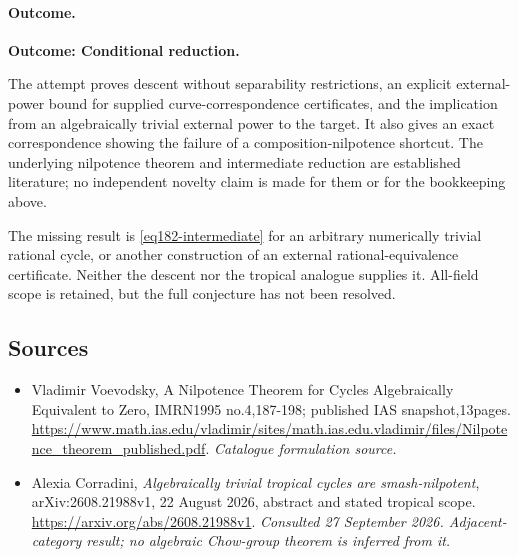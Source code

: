 \documentclass[11pt,a4paper]{article}
\numberwithin{equation}{section}
\begin{document}
\paragraph{Outcome.}
\textbf{Outcome: Conditional reduction.}

The attempt proves descent without separability restrictions, an explicit
external-power bound for supplied curve-correspondence certificates, and
the implication from an algebraically trivial external power to the target.
It also gives an exact correspondence showing the failure of a
composition-nilpotence shortcut. The underlying nilpotence theorem and
intermediate reduction are established literature; no independent novelty
claim is made for them or for the bookkeeping above.

The missing result is \eqref{eq182-intermediate} for an arbitrary
numerically trivial rational cycle, or another construction of an external
rational-equivalence certificate. Neither the descent nor the tropical
analogue supplies it. All-field scope is retained, but the full conjecture
has not been resolved.
\subsection{Sources}
\begin{itemize}\raggedright
\item[\textnormal{[S1]}]\hypertarget{source:statement:1}{} Vladimir Voevodsky, A Nilpotence Theorem for Cycles Algebraically Equivalent to Zero, IMRN1995 no.4,187-198; published IAS snapshot,13pages.
\url{https://www.math.ias.edu/vladimir/sites/math.ias.edu.vladimir/files/Nilpotence_theorem_published.pdf}.
{\small\textit{Catalogue formulation source.}}
\item[\textnormal{[E1]}]\hypertarget{extra:statement:1}{} Alexia Corradini,
\emph{Algebraically trivial tropical cycles are smash-nilpotent},
arXiv:2608.21988v1, 22 August 2026, abstract and stated tropical scope.
\url{https://arxiv.org/abs/2608.21988v1}.
{\small\textit{Consulted 27 September 2026. Adjacent-category result;
no algebraic Chow-group theorem is inferred from it.}}
\end{itemize}
\end{document}
